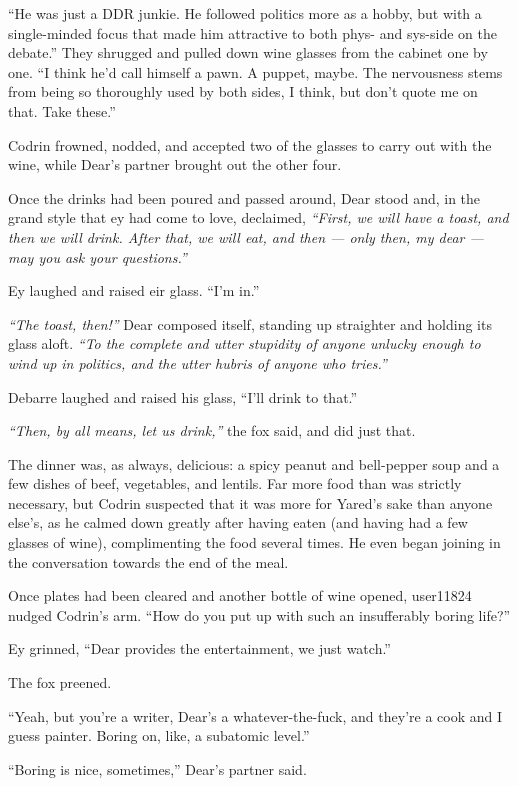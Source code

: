``He was just a DDR junkie. He followed politics more as a hobby, but with a single-minded focus that made him attractive to both phys- and sys-side on the debate.'' They shrugged and pulled down wine glasses from the cabinet one by one. ``I think he'd call himself a pawn. A puppet, maybe. The nervousness stems from being so thoroughly used by both sides, I think, but don't quote me on that. Take these.''

Codrin frowned, nodded, and accepted two of the glasses to carry out with the wine, while Dear's partner brought out the other four.

Once the drinks had been poured and passed around, Dear stood and, in the grand style that ey had come to love, declaimed, \emph{``First, we will have a toast, and then we will drink. After that, we will eat, and then — only then, my dear — may you ask your questions.''}

Ey laughed and raised eir glass. ``I'm in.''

\emph{``The toast, then!''} Dear composed itself, standing up straighter and holding its glass aloft. \emph{``To the complete and utter stupidity of anyone unlucky enough to wind up in politics, and the utter hubris of anyone who tries.''}

Debarre laughed and raised his glass, ``I'll drink to that.''

\emph{``Then, by all means, let us drink,''} the fox said, and did just that.

The dinner was, as always, delicious: a spicy peanut and bell-pepper soup and a few dishes of beef, vegetables, and lentils. Far more food than was strictly necessary, but Codrin suspected that it was more for Yared's sake than anyone else's, as he calmed down greatly after having eaten (and having had a few glasses of wine), complimenting the food several times. He even began joining in the conversation towards the end of the meal.

Once plates had been cleared and another bottle of wine opened, user11824 nudged Codrin's arm. ``How do you put up with such an insufferably boring life?''

Ey grinned, ``Dear provides the entertainment, we just watch.''

The fox preened.

``Yeah, but you're a writer, Dear's a whatever-the-fuck, and they're a cook and I guess painter. Boring on, like, a subatomic level.''

``Boring is nice, sometimes,'' Dear's partner said.

